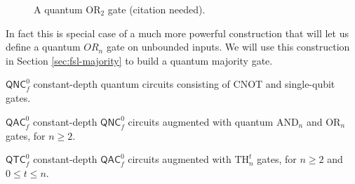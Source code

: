 \begin{figure}
\caption{A quantum $\text{OR}_2$ gate (citation needed).}
\label{fig:or2}
\end{figure}

In fact this is special case of a much more powerful construction
that will let us define a quantum $OR_n$ gate on unbounded inputs.
We will use this construction in Section \ref{sec:fsl-majority}
to build a quantum majority gate.

\begin{definition}
\item[$\textsf{QNC}^0_f$]
constant-depth quantum circuits consisting of CNOT and single-qubit gates.
\item[$\textsf{QAC}^0_f$]
constant-depth $\textsf{QNC}^0_f$ circuits augmented with quantum $\text{AND}_n$ and $\text{OR}_n$ gates,
for $n \ge 2$.
\item[$\textsf{QTC}^0_f$]
constant-depth $\textsf{QAC}^0_f$ circuits augmented with $\text{TH}_n^t$ gates, for $n \ge 2$ and
$0 \le t \le n$.
\end{definition}